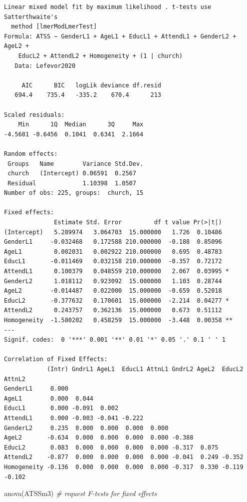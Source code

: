 \documentclass[
  english,
]{book}
\newenvironment{Shaded}{\begin{snugshade}}{\end{snugshade}}
\newcommand{\CommentTok}[1]{\textcolor[rgb]{0.56,0.35,0.01}{\textit{#1}}}
\newcommand{\FunctionTok}[1]{\textcolor[rgb]{0.00,0.00,0.00}{#1}}
\newcommand{\NormalTok}[1]{#1}
\begin{document}
\begin{verbatim}
Linear mixed model fit by maximum likelihood . t-tests use Satterthwaite's
  method [lmerModLmerTest]
Formula: ATSS ~ GenderL1 + AgeL1 + EducL1 + AttendL1 + GenderL2 + AgeL2 +  
    EducL2 + AttendL2 + Homogeneity + (1 | church)
   Data: Lefevor2020

     AIC      BIC   logLik deviance df.resid 
   694.4    735.4   -335.2    670.4      213 

Scaled residuals: 
    Min      1Q  Median      3Q     Max 
-4.5681 -0.6456  0.1041  0.6341  2.1664 

Random effects:
 Groups   Name        Variance Std.Dev.
 church   (Intercept) 0.06591  0.2567  
 Residual             1.10398  1.0507  
Number of obs: 225, groups:  church, 15

Fixed effects:
              Estimate Std. Error         df t value Pr(>|t|)   
(Intercept)   5.289974   3.064703  15.000000   1.726  0.10486   
GenderL1     -0.032468   0.172588 210.000000  -0.188  0.85096   
AgeL1         0.002031   0.002922 210.000000   0.695  0.48783   
EducL1       -0.011469   0.032158 210.000000  -0.357  0.72172   
AttendL1      0.100379   0.048559 210.000000   2.067  0.03995 * 
GenderL2      1.018112   0.923092  15.000000   1.103  0.28744   
AgeL2        -0.014487   0.022000  15.000000  -0.659  0.52018   
EducL2       -0.377632   0.170601  15.000000  -2.214  0.04277 * 
AttendL2      0.243757   0.362136  15.000000   0.673  0.51112   
Homogeneity  -1.580202   0.458259  15.000000  -3.448  0.00358 **
---
Signif. codes:  0 '***' 0.001 '**' 0.01 '*' 0.05 '.' 0.1 ' ' 1

Correlation of Fixed Effects:
            (Intr) GndrL1 AgeL1  EducL1 AttnL1 GndrL2 AgeL2  EducL2 AttnL2
GenderL1     0.000                                                        
AgeL1        0.000  0.044                                                 
EducL1       0.000 -0.091  0.002                                          
AttendL1     0.000 -0.003 -0.041 -0.222                                   
GenderL2     0.235  0.000  0.000  0.000  0.000                            
AgeL2       -0.634  0.000  0.000  0.000  0.000 -0.388                     
EducL2       0.083  0.000  0.000  0.000  0.000 -0.317  0.075              
AttendL2    -0.877  0.000  0.000  0.000  0.000 -0.041  0.249 -0.352       
Homogeneity -0.136  0.000  0.000  0.000  0.000 -0.317  0.330 -0.119 -0.102
\end{verbatim}

\begin{Shaded}
\begin{Highlighting}[]
\FunctionTok{anova}\NormalTok{(ATSSm3) }\CommentTok{\# request F{-}tests for fixed effects}
\end{Highlighting}
\end{Shaded}
\end{document}
